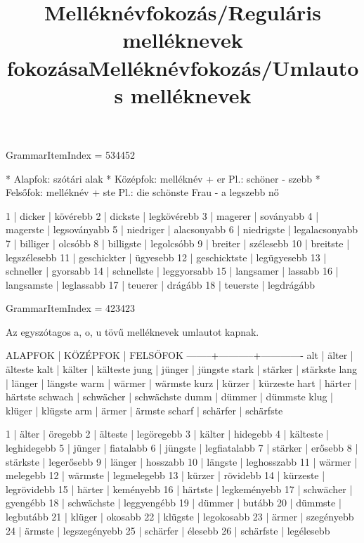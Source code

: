 \title{Melléknévfokozás/Reguláris melléknevek fokozása}

GrammarItemIndex = 534452

\begin{desc}
* Alapfok: szótári alak
* Középfok: melléknév + er
  Pl.: schöner - szebb
* Felsőfok: melléknév + ste
  Pl.: die schönste Frau - a legszebb nő
\end{desc}

\begin{exmp}
1 | dicker | kövérebb
2 | dickste | legkövérebb
3 | magerer | soványabb
4 | magerste | legsoványabb
5 | niedriger | alacsonyabb
6 | niedrigste | legalacsonyabb
7 | billiger | olcsóbb
8 | billigste | legolcsóbb
9 | breiter | szélesebb
10 | breitste | legszélesebb
11 | geschickter | ügyesebb
12 | geschicktste | legügyesebb
13 | schneller | gyorsabb
14 | schnellste | leggyorsabb
15 | langsamer | lassabb
16 | langsamste | leglassabb
17 | teuerer | drágább
18 | teuerste | legdrágább
\end{exmp}

\title{Melléknévfokozás/Umlautos melléknevek}

GrammarItemIndex = 423423

\begin{desc}
Az egyszótagos a, o, u tövű melléknevek umlautot kapnak.

ALAPFOK | KÖZÉPFOK  | FELSŐFOK
--------+-----------+-------------
alt     | älter     | älteste
kalt    | kälter    | kälteste
jung    | jünger    | jüngste
stark   | stärker   | stärkste
lang    | länger    | längste
warm    | wärmer    | wärmste
kurz    | kürzer    | kürzeste
hart    | härter    | härtste
schwach | schwächer | schwächste
dumm    | dümmer    | dümmste
klug    | klüger    | klügste
arm     | ärmer     | ärmste
scharf  | schärfer  | schärfste
\end{desc}

\begin{exmp}
1 | älter | öregebb
2 | älteste | legöregebb
3 | kälter | hidegebb
4 | kälteste | leghidegebb
5 | jünger | fiatalabb
6 | jüngste | legfiatalabb
7 | stärker | erősebb
8 | stärkste | legerősebb
9 | länger | hosszabb
10 | längste | leghosszabb
11 | wärmer | melegebb
12 | wärmste | legmelegebb
13 | kürzer | rövidebb
14 | kürzeste | legrövidebb
15 | härter | keményebb
16 | härtste | legkeményebb
17 | schwächer | gyengébb
18 | schwächste | leggyengébb
19 | dümmer | butább
20 | dümmste | legbutább
21 | klüger | okosabb
22 | klügste | legokosabb
23 | ärmer | szegényebb
24 | ärmste | legszegényebb
25 | schärfer | élesebb
26 | schärfste | legélesebb
\end{exmp}

